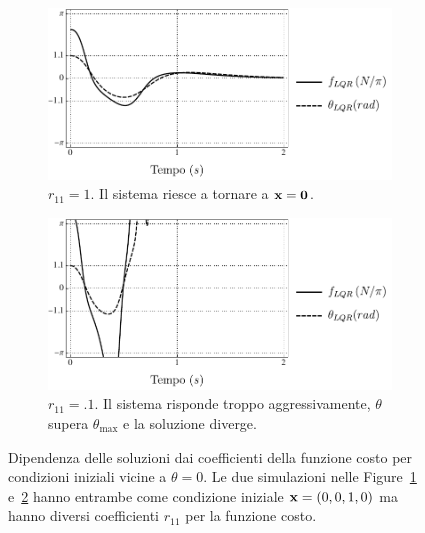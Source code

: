 \begin{figure}
    \vskip 0pt
    \centering
    \begin{subfigure}[t]{0.48\textwidth}
        \centering
        \includegraphics[width=\textwidth]{assets/occasional-blowup-r1}
        \caption{$r_{11} = 1$. Il sistema riesce a tornare a $\mathbf{x} = \mathbf{0}$.}
        \label{eq:does-not-blowup}
    \end{subfigure}
    \hfill
    \begin{subfigure}[t]{0.48\textwidth}
        \centering
        \includegraphics[width=\textwidth]{assets/occasional-blowup-r.1}
        \caption{$r_{11} = .1$. Il sistema risponde troppo
            aggressivamente, $\theta$ supera $\theta_{\max}$ e la soluzione diverge.}
        \label{eq:does-blowup}
    \end{subfigure}
    \caption[Dipendenza delle soluzioni dal costo]{
        Dipendenza delle soluzioni dai coefficienti della funzione costo
        per condizioni iniziali vicine a $\theta = 0$.
        Le due simulazioni nelle Figure~\ref{eq:does-not-blowup} e~\ref{eq:does-blowup}
        hanno entrambe come condizione iniziale $\mathbf{x} = (0, 0, 1, 0)$ ma
        hanno diversi coefficienti $r_{11}$ per la funzione costo.
    }
    \label{fig:occasional-blowup}
\end{figure}

